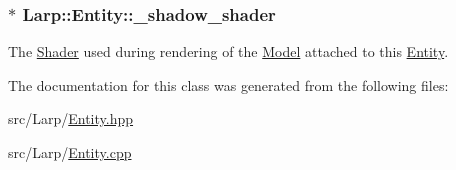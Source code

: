 \subsubsection[{\texorpdfstring{\+\_\+shadow\+\_\+shader}{_shadow_shader}}]{$\ast$ Larp\+::\+Entity\+::\+\_\+shadow\+\_\+shader\hspace{0.3cm}{\ttfamily [private]}}\hypertarget{classLarp_1_1Entity_ab453b22bd62255f1b9bdaff45d54051b}{}\label{classLarp_1_1Entity_ab453b22bd62255f1b9bdaff45d54051b}
The \hyperlink{classLarp_1_1Shader}{Shader} used during rendering of the \hyperlink{classLarp_1_1Model}{Model} attached to this \hyperlink{classLarp_1_1Entity}{Entity}. 

The documentation for this class was generated from the following files\+:\begin{DoxyCompactItemize}
\item 
src/\+Larp/\hyperlink{Entity_8hpp}{Entity.\+hpp}\item 
src/\+Larp/\hyperlink{Entity_8cpp}{Entity.\+cpp}\end{DoxyCompactItemize}
